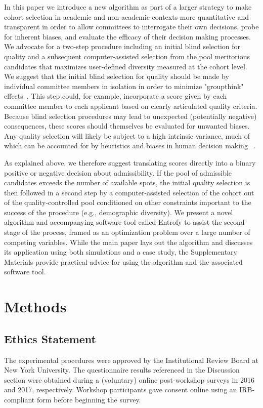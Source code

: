 \documentclass[10pt,letterpaper]{article}
\begin{document}
In this paper we introduce a new algorithm as part of a larger strategy to make cohort selection in academic and non-academic contexts more quantitative and transparent in order to allow committees to interrogate their own decisions, probe for inherent biases, and evaluate the efficacy of their decision making processes.   
We advocate for a two-step procedure including an initial blind selection for quality and a subsequent computer-assisted selection from the pool meritorious candidates that maximizes user-defined diversity measured at the cohort level. We suggest that the initial blind selection for quality should be made by individual committee members in isolation in order to minimize "groupthink" effects~\cite{janis1982}.
This step could, for example, incorporate a score given by each committee member to each applicant based on clearly articulated quality criteria.
Because blind selection procedures may lead to unexpected (potentially negative) consequences, these scores should themselves be evaluated for unwanted biases.
Any quality selection will likely be subject to a high intrinsic variance, much of which can be accounted for by heuristics and biases in human decision making ~\cite{Greenwald1995, grove1996}.

As explained above, we therefore suggest translating scores directly into a binary positive or negative decision about admissibility.
If the pool of admissible candidates exceeds the number of available spots, the initial quality selection is then followed in a second step by a computer-assisted selection of the cohort out of the quality-controlled pool conditioned on other constraints important to the success of the procedure (e.g., demographic diversity). We present a novel algorithm and accompanying software tool called Entrofy to assist the second stage of the process, framed as an optimization problem over a large number of competing variables. While the main paper lays out the algorithm and discusses its application using both simulations and a case study, the Supplementary Materials provide practical advice for using the algorithm and the associated software tool.

\section*{Methods}
\label{sec:algorithm}

\subsection*{Ethics Statement}
The experimental procedures were approved by the Institutional Review Board at New York University. The questionnaire results referenced in the Discussion section were obtained during a (voluntary) online post-workshop surveys in 2016 and 2017, respectively. Workshop participants gave consent online using an IRB-compliant form before beginning the survey. 
\end{document}
